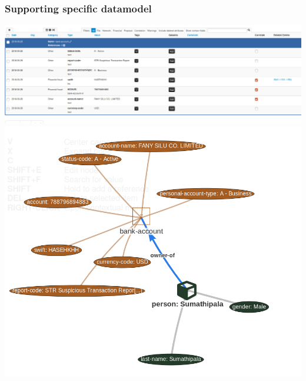 \begin{frame}
        \frametitle{Supporting specific datamodel}
        \includegraphics[scale=0.24]{screenshots/bankaccount.png}
        \includegraphics[scale=0.18]{screenshots/bankview.png}
\end{frame}

